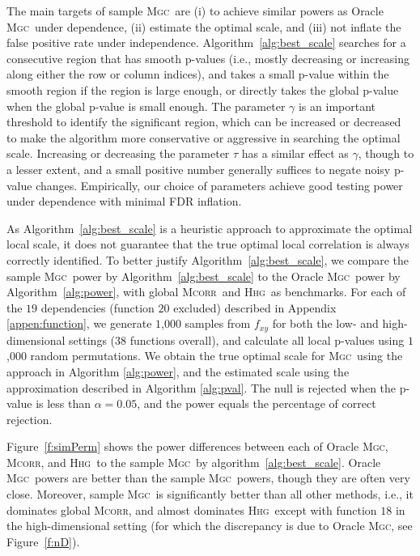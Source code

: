 \documentclass[11pt]{article}
\providecommand{\sct}[1]{{\normalfont\textsc{#1}}}
\newcommand{\Mgc}{\sct{Mgc}}
\newcommand{\Hhg}{\sct{Hhg}}
\newcommand{\Mcorr}{\sct{Mcorr}}
\begin{document}
The main targets of sample \Mgc~are (i) to achieve similar powers as Oracle \Mgc~under dependence, (ii) estimate the optimal scale, and (iii) not inflate the false positive rate under independence. Algorithm~\ref{alg:best_scale} searches for a consecutive region that has smooth p-values (i.e., mostly decreasing or increasing along either the row or column indices), and takes a small p-value within the smooth region if the region is large enough, or directly takes the global p-value when the global p-value is small enough. The parameter $\gamma$ is an important threshold to identify the significant region, which can be increased or decreased to make the algorithm more conservative or aggressive in searching the optimal scale. Increasing or decreasing the parameter $\tau$ has a similar effect as $\gamma$, though to a lesser extent, and a small positive number generally suffices to negate noisy p-value changes. Empirically, our choice of parameters achieve good testing power under dependence with minimal FDR inflation.

As Algorithm~\ref{alg:best_scale} is a heuristic approach to approximate the optimal local scale, it does not guarantee that the true optimal local correlation is always correctly identified. To better justify Algorithm~\ref{alg:best_scale}, we compare the sample \Mgc~power by Algorithm~\ref{alg:best_scale} to the Oracle \Mgc~power by Algorithm~\ref{alg:power}, with  global \Mcorr~and \Hhg~as benchmarks. For each of the $19$ dependencies (function $20$ excluded) described in Appendix \ref{appen:function}, we generate $1$,$000$ samples from $f_{xy}$ for both the low- and high-dimensional settings ($38$ functions overall), and calculate all local p-values using $1$,$000$ random permutations. 
We obtain the true optimal scale for \Mgc~using the approach in Algorithm \ref{alg:power}, and the estimated scale using the approximation described in Algorithm \ref{alg:pval}.  
The null is rejected when the p-value is less than $\alpha=0.05$, and the power equals the percentage of correct rejection. 

Figure~\ref{f:simPerm} shows the power differences between each of Oracle \Mgc, \Mcorr, and \Hhg~to the sample \Mgc~by algorithm~\ref{alg:best_scale}. Oracle \Mgc~powers are better than the sample \Mgc~powers, though they are often very close. Moreover, sample \Mgc~is significantly better than all other methods, i.e., it dominates global \Mcorr, and almost dominates \Hhg~except with function $18$ in the high-dimensional setting (for which the discrepancy is due to Oracle \Mgc, see Figure~\ref{f:nD}). 
\end{document}
